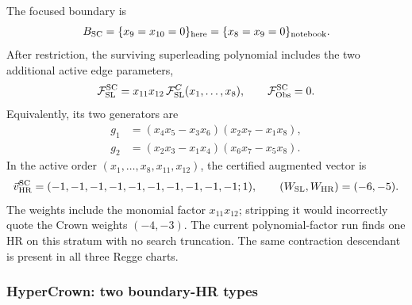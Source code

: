 \documentclass[a4paper,11pt]{article}
\newcommand{\WSL}{W_{\rm SL}}
\newcommand{\WHR}{W_{\rm HR}}
\newcommand{\vHR}{\vec v_{\rm HR}}
\begin{document}
The focused boundary is
\begin{equation}
 B_{\rm SC}=\{x_9=x_{10}=0\}_{\rm here}
 =\{x_8=x_9=0\}_{\rm notebook}.
 \label{eq:SC-boundary}
\end{equation}
After restriction, the surviving superleading polynomial includes the two
additional active edge parameters,
\begin{equation}
 \mathcal F_{\rm SL}^{\rm SC}
 =x_{11}x_{12}\,\mathcal F_{\rm SL}^{C}(x_1,\ldots,x_8),
 \qquad \mathcal F_{\rm Obs}^{\rm SC}=0.
 \label{eq:SC-decomposition}
\end{equation}
Equivalently, its two generators are
\begin{align}
 g_1&=(x_4x_5-x_3x_6)(x_2x_7-x_1x_8),\\
 g_2&=(x_2x_3-x_1x_4)(x_6x_7-x_5x_8).
 \label{eq:SC-generators}
\end{align}
In the active order \((x_1,\ldots,x_8,x_{11},x_{12})\), the certified
augmented vector is
\begin{equation}
 \vHR^{\rm SC}=(-1,-1,-1,-1,-1,-1,-1,-1,-1,-1;1),
 \qquad (\WSL,\WHR)=(-6,-5).
 \label{eq:SC-vector}
\end{equation}
The weights include the monomial factor \(x_{11}x_{12}\); stripping it would
incorrectly quote the Crown weights \((-4,-3)\).  The current
polynomial-factor run finds one HR on this stratum with no search truncation.
The same contraction descendant is present in all three Regge charts.

\subsubsection*{HyperCrown: two boundary-HR types}
\end{document}
